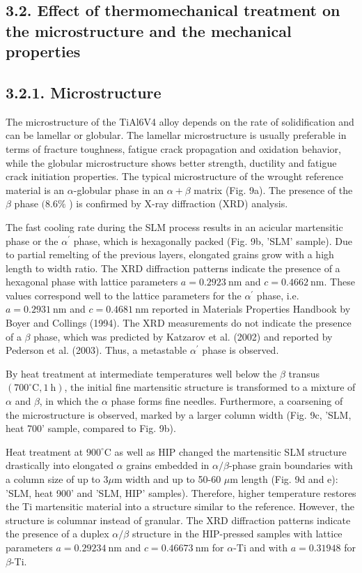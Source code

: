 \documentclass[10pt]{article}
\begin{document}
\subsection*{3.2. Effect of thermomechanical treatment on the microstructure and the mechanical properties}
\subsection*{3.2.1. Microstructure}
The microstructure of the TiAl6V4 alloy depends on the rate of solidification and can be lamellar or globular. The lamellar microstructure is usually preferable in terms of fracture toughness, fatigue crack propagation and oxidation behavior, while the globular microstructure shows better strength, ductility and fatigue crack initiation properties. The typical microstructure of the wrought reference material is an $\alpha$-globular phase in an $\alpha+\beta$ matrix (Fig. 9a). The presence of the $\beta$ phase $(8.6 \%$ ) is confirmed by X-ray diffraction (XRD) analysis.

The fast cooling rate during the SLM process results in an acicular martensitic phase or the $\alpha^{\prime}$ phase, which is hexagonally packed (Fig. 9b, 'SLM' sample). Due to partial remelting of the previous layers, elongated grains grow with a high length to width ratio. The XRD diffraction patterns indicate the presence of a hexagonal phase with lattice parameters $a=0.2923 \mathrm{~nm}$ and $c=0.4662 \mathrm{~nm}$. These values correspond well to the lattice parameters for the $\alpha^{\prime}$ phase, i.e. $a=0.2931 \mathrm{~nm}$ and $c=0.4681 \mathrm{~nm}$ reported in Materials Properties Handbook by Boyer and Collings (1994). The XRD measurements do not indicate the presence of a $\beta$ phase, which was predicted by Katzarov et al. (2002) and reported by Pederson et al. (2003). Thus, a metastable $\alpha^{\prime}$ phase is observed.

By heat treatment at intermediate temperatures well below the $\beta$ transus $\left(700^{\circ} \mathrm{C}, 1 \mathrm{~h}\right)$, the initial fine martensitic structure is transformed to a mixture of $\alpha$ and $\beta$, in which the $\alpha$ phase forms fine needles. Furthermore, a coarsening of the microstructure is observed, marked by a larger column width (Fig. 9c, 'SLM, heat 700' sample, compared to Fig. 9b).

Heat treatment at $900^{\circ} \mathrm{C}$ as well as HIP changed the martensitic SLM structure drastically into elongated $\alpha$ grains embedded in $\alpha / \beta$-phase grain boundaries with a column size of up to $3 \mu \mathrm{m}$ width and up to 50-60 $\mu \mathrm{m}$ length (Fig. 9d and e): 'SLM, heat 900' and 'SLM, HIP' samples). Therefore, higher temperature restores the Ti martensitic material into a structure similar to the reference. However, the structure is columnar instead of granular. The XRD diffraction patterns indicate the presence of a duplex $\alpha / \beta$ structure in the HIP-pressed samples with lattice parameters $a=0.29234 \mathrm{~nm}$ and $c=0.46673 \mathrm{~nm}$ for $\alpha$-Ti and with $a=0.31948$ for $\beta$-Ti.
\end{document}
